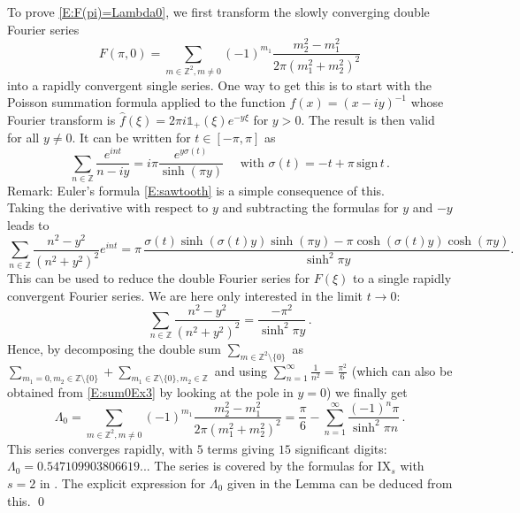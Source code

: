 \documentclass[12pt]{amsart}
\theoremstyle{definition}
\theoremstyle{remark}
\numberwithin{equation}{section}
\newcommand\Z{{\mathbb Z}}
\newcommand{\sign}{\mathrm{sign}}
\let\hat=\widehat
\begin{document}
To prove \eqref{E:F(pi)=Lambda0}, we first transform the slowly converging double Fourier series
\begin{equation}
\label{E:FLambda0}
 F(\pi,0) = 
  \sum_{m\in\Z^{2},m\ne0}(-1)^{m_{1}}\frac{m_{2}^{2}-m_{1}^{2}}{2\pi(m_{1}^{2}+m_{2}^{2})^{2}}
\end{equation}
into a rapidly convergent single series. One way to get this is to start with the Poisson summation formula applied to the function $f(x)=(x-iy)^{-1}$ whose Fourier transform is 
$\hat f(\xi)=2\pi i \mathds{1}_{+}(\xi)e^{-y\xi}$ for $y>0$. The result is then valid for all $y\ne0$. It can be written for $t\in[-\pi,\pi]$ as
\begin{equation}
 \label{E:1Ex3}
 \sum_{n\in\Z}\frac{e^{int}}{n-iy} =
 i \pi \frac{e^{y\sigma(t)}}{\sinh(\pi y)} 
 \quad \mbox{ with }
 \sigma(t) = -t + \pi\,\sign\, t\,.
\end{equation}
Remark: Euler's formula \eqref{E:sawtooth} is a simple consequence of this.\\
Taking the derivative with respect to $y$ and subtracting the formulas for $y$ and $-y$ leads to
\begin{equation}
 \label{E:sum1Ex3}
 \sum_{n\in\Z}\frac{n^{2}-y^{2}}{(n^{2}+y^{2})^{2}}e^{int} =
 \pi \,
  \frac{\sigma(t)\sinh(\sigma(t)y)\sinh(\pi y)-\pi\cosh(\sigma(t)y)\cosh(\pi y)}{\sinh^{2}\pi y} .
 \end{equation}
This can be used to reduce the double Fourier series for $F(\xi)$ to a single rapidly convergent Fourier series. We are here only interested in the limit $t\to0$:
\begin{equation}
 \label{E:sum0Ex3}
 \sum_{n\in\Z}\frac{n^{2}-y^{2}}{(n^{2}+y^{2})^{2}} =
  \frac{-\pi^{2}}{\sinh^{2}\pi y} \,.
 \end{equation}
Hence, by decomposing the double sum $\sum_{m\in\Z^{2}\setminus\{0\}}$ as
$\sum_{m_{1}=0,m_{2}\in\Z\setminus\{0\}}+\sum_{m_{1}\in\Z\setminus\{0\},m_{2}\in\Z}$ and using
$\sum_{n=1}^{\infty}\frac1{n^{2}}=\frac{\pi^{2}}6$ (which can also be obtained from \eqref{E:sum0Ex3} by looking at the pole in $y=0$)
we finally get
\begin{equation}
\label{E:Lambda0}
\Lambda_{0}=
\sum_{m\in\Z^{2},m\ne0}(-1)^{m_{1}}\frac{m_{2}^{2}-m_{1}^{2}}{2\pi(m_{1}^{2}+m_{2}^{2})^{2}}
=  \frac\pi6 - \sum_{n=1}^{\infty}\frac{(-1)^{n}\pi}{\sinh^{2}\pi n}\,.
\end{equation}
This series converges rapidly, with $5$ terms giving $15$ significant digits:
$\Lambda_{0}=0.547109903806619...$
The series is covered by the formulas for $\mathrm{IX}_{s}$ with $s=2$ in \cite{Zucker1979}.
The explicit expression for $\Lambda_{0}$ given in the Lemma can be deduced from this.
\qed\endtrivlist
\end{document}
